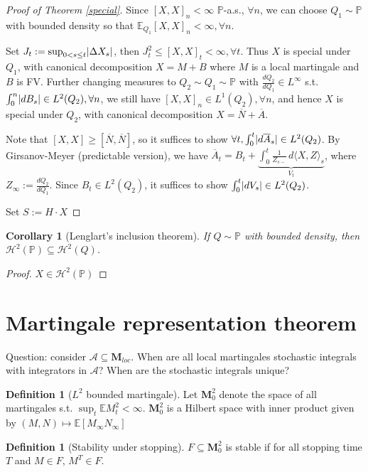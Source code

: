 \documentclass[openany,oneside]{book}
\newtheorem{cor}[thm]{Corollary}
\theoremstyle{definition}
\newtheorem{defn}[thm]{Definition}
\theoremstyle{remark}
\newcommand{\E}{\mathbb{E}} %
\renewcommand{\P}{\mathbb{P}} %
\DeclarePairedDelimiter{\abs}{\lvert}{\rvert} %
\newcommand{\sH}[1][2]{\mathcal{H}^{#1}} %
\begin{document}
\begin{proof}[Proof of Theorem \ref{special}]
Since $[X,X]_n < \infty$ $\P$-a.s., $\forall n$, we can choose $Q_1 \sim \P$ with bounded density so that $\E_{Q_1}[X,X]_n < \infty, \forall n$.
\par
Set $J_t := \sup_{0< s\le t}\abs{\Delta X_s}$, then $J_t^2 \le [X,X]_t < \infty, \forall t$. Thus $X$ is special under $Q_1$, with canonical decomposition $X=M+B$ where $M$ is a local martingale and $B$ is FV. Further changing measures to $Q_2 \sim Q_1 \sim \P$ with $\frac{d Q_2}{d Q_1}\in L^\infty$ s.t. $\int_0^n \abs{d B_s} \in L^2(Q_2), \forall n$, we still have $[X,X]_n \in L^1(Q_2), \forall n$, and hence $X$ is special under $Q_2$, with canonical decomposition $X=\overline{N}+\overline{A}$.
\par
Note that $[X,X] \ge [\overline{N},\overline{N}]$, so it suffices to show $\forall t, \int_0^t \abs{d\overline{A}_s} \in L^2(Q_2)$. By Girsanov-Meyer (predictable version), we have $\overline{A}_t = B_t + \underbrace{\int_0^t \frac{1}{Z_{s-}} \,d\langle X,Z\rangle_s}_{V_t}$, where $Z_\infty := \frac{d Q_2}{d Q_1}$. Since $B_t\in L^2(Q_2)$, it suffices to show $\int_0^t \abs{d V_s} \in L^2(Q_2)$.
\par
Set $S:=H\cdot X$
\end{proof}

\begin{cor}[Lenglart's inclusion theorem]
If $Q\sim\P$ with bounded density, then $\sH(\P) \subseteq \sH(Q)$.
\end{cor}
\begin{proof}
$X\in \sH(\P)$
\end{proof}


\section{Martingale representation theorem}
Question: consider $\mathcal{A} \subseteq \mathbf{M}_{loc}$. When are all local martingales stochastic integrals with integrators in $\mathcal{A}$? When are the stochastic integrals unique?

\begin{defn}[$L^2$ bounded martingale]
Let $\mathbf{M}^2_0$ denote the space of all martingales s.t. $\sup_t \E M^2_t < \infty$. $\mathbf{M}^2_0$ is a Hilbert space with inner product given by $(M,N) \mapsto \E[M_\infty N_\infty]$
\end{defn}

\begin{defn}[Stability under stopping]
$F\subseteq \mathbf{M}^2_0$ is stable if for all stopping time $T$ and $M\in F$, $M^T \in F$.
\end{defn}
\end{document}
